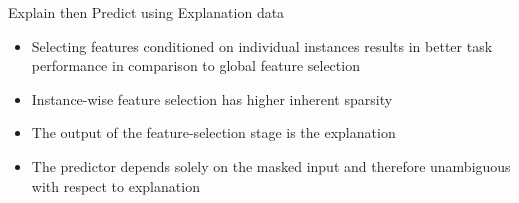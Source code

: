 \documentclass[11pt,compress,t,notes=noshow, aspectratio=169, xcolor=table]{beamer}
\begin{document}
\begin{frame}{Explain then Predict using Explanation data}
\begin{itemize}
    \item Selecting features conditioned on individual instances results in better task performance in
comparison to global feature selection
    \bigskip
    \item Instance-wise feature selection has higher inherent sparsity
    \bigskip
    \item The output of the feature-selection stage is the explanation
    \bigskip
    \item The predictor depends solely on the masked input and therefore unambiguous with respect to
explanation
\end{itemize}
    
\end{frame}



\endlecture
\end{document}
